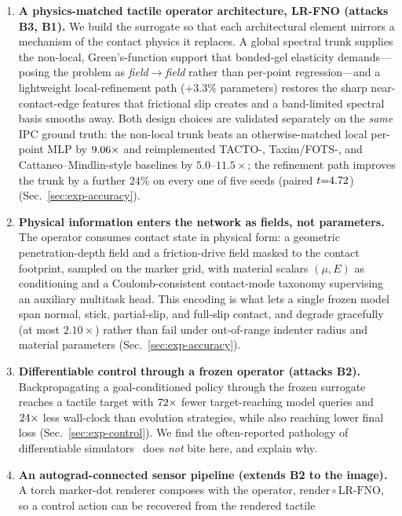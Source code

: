 \documentclass[conference]{IEEEtran}
\newcommand{\baselineSpanLo}{5.0}   \newcommand{\baselineSpanHi}{11.5}
\newcommand{\refineGain}{24}    %
\newcommand{\oodR}{2.10} \newcommand{\oodMu}{1.63} \newcommand{\oodE}{1.32}
\begin{document}
\begin{enumerate}
\item \textbf{A physics-matched tactile operator architecture, LR-FNO (attacks B3, B1).}
We build the surrogate so that each architectural element mirrors a mechanism of
the contact physics it replaces. A global spectral trunk supplies the non-local,
Green's-function support that bonded-gel elasticity demands---posing the problem
as \emph{field$\to$field} rather than per-point regression---and a lightweight
local-refinement path ($+3.3\%$ parameters) restores the sharp near-contact-edge
features that frictional slip creates and a band-limited spectral basis smooths
away. Both design choices are validated separately on the \emph{same} IPC ground
truth: the non-local trunk beats an otherwise-matched local per-point MLP by
$9.06\times$ and reimplemented TACTO-, Taxim/FOTS-, and Cattaneo--Mindlin-style
baselines by $\baselineSpanLo$--$\baselineSpanHi\times$; the refinement path
improves the trunk by a further $\refineGain\%$ on every one of five seeds
(paired $t{=}4.72$) (Sec.~\ref{sec:exp-accuracy}).
\item \textbf{Physical information enters the network as fields, not parameters.}
The operator consumes contact state in physical form: a geometric
penetration-depth field and a friction-drive field masked to the contact
footprint, sampled on the marker grid, with material scalars $(\mu,E)$ as
conditioning and a Coulomb-consistent contact-mode taxonomy supervising an
auxiliary multitask head. This encoding is what lets a single frozen model span
normal, stick, partial-slip, and full-slip contact, and degrade gracefully
(at most $\oodR\times$) rather than fail under out-of-range indenter radius and
material parameters (Sec.~\ref{sec:exp-accuracy}).
\item \textbf{Differentiable control through a frozen operator (attacks B2).}
Backpropagating a goal-conditioned policy through the frozen surrogate reaches a
tactile target with $72\times$ fewer target-reaching model queries and
$24\times$ less wall-clock than evolution strategies, while also reaching lower
final loss (Sec.~\ref{sec:exp-control}). We find the often-reported pathology of
differentiable simulators~\cite{suh2022diffsim} does \emph{not} bite here, and
explain why.
\item \textbf{An autograd-connected sensor pipeline (extends B2 to the image).}
A torch marker-dot renderer composes with the operator, $\mathrm{render}\circ
\mathrm{LR\mbox{-}FNO}$, so a control action can be recovered from the rendered tactile

\end{enumerate}
\end{document}
